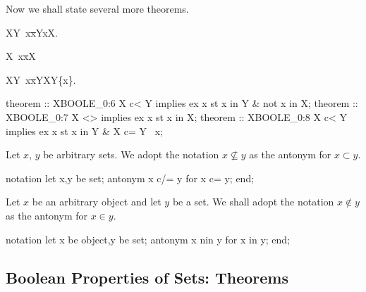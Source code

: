 \begin{paracol}{2}
\switchcolumn*\ensurevspace{5cm}
Now we shall state several more theorems.
\begin{theorem}
X\propersubset Y\implies\ \ex x\st x\in Y\land x\notin X.
\end{theorem}
\begin{theorem}
X\neq\emptyset\implies\ \ex x\st x\in X
\end{theorem}
\begin{theorem}
X\propersubset Y\implies\ \ex x\st x\in Y\land X\subset Y\setminus\{x\}.
\end{theorem}
\switchcolumn
\begin{mizar}
theorem :: XBOOLE_0:6
  X c< Y implies ex x st x in Y
                        & not x in X;
theorem :: XBOOLE_0:7
  X <> {} implies ex x st x in X;
theorem :: XBOOLE_0:8
 X c< Y implies ex x st x in Y 
                      & X c= Y \ {x};
\end{mizar}

\switchcolumn*\ensurevspace{5cm}
Let $x$, $y$ be arbitrary sets.
We adopt the notation $x\nsubseteq y$ as the antonym for $x\subset y$.
\switchcolumn
\begin{mizar}
notation
  let x,y be set;
  antonym x c/= y for x c= y;
end;
\end{mizar}

\switchcolumn*\ensurevspace{5cm}
Let $x$ be an arbitrary object and let $y$ be a set.
We shall adopt the notation $x\notin y$ as the antonym for $x\in y$.
\switchcolumn
\begin{mizar}
notation
  let x be object,y be set;
  antonym x nin y for x in y;
end;
\end{mizar}

\end{paracol}


\subsection{Boolean Properties of Sets: Theorems}
\bigskip

\begin{paracol}{2}
\end{paracol}